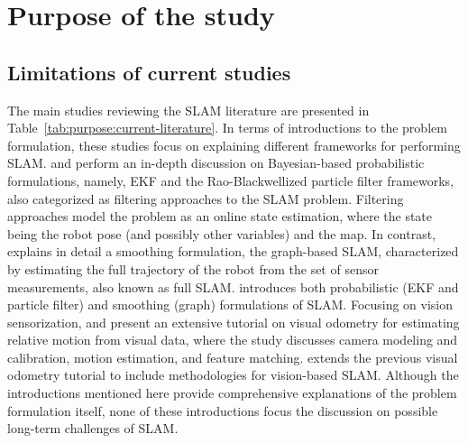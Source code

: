 \section{Purpose of the study}
\label{sec:purpose}

\subsection{Limitations of current studies}

The main studies reviewing the SLAM literature are presented in Table~\ref{tab:purpose:current-literature}. In terms of introductions to the problem formulation, these studies focus on explaining different frameworks for performing SLAM. \cite{purpose:study:durrant-whyte-bailey:2006:1} and \cite{purpose:study:durrant-whyte-bailey:2006:2} perform an in-depth discussion on Bayesian-based probabilistic formulations, namely, EKF and the Rao-Blackwellized particle filter frameworks, also categorized as filtering approaches to the SLAM problem. Filtering approaches model the problem as an online state estimation, where the state being the robot pose (and possibly other variables) and the map. In contrast, \cite{purpose:study:grisetti:2010} explains in detail a smoothing formulation, the graph-based SLAM, characterized by estimating the full trajectory of the robot from the set of sensor measurements, also known as full SLAM. \cite{purpose:study:thrun:2008} introduces both probabilistic (EKF and particle filter) and smoothing (graph) formulations of SLAM.
Focusing on vision sensorization, \cite{purpose:study:scaramuzza-fraundorfer:2011:1} and \cite{purpose:study:scaramuzza-fraundorfer:2012:2} present an extensive tutorial on visual odometry for estimating relative motion from visual data, where the study discusses camera modeling and calibration, motion estimation, and feature matching. \cite{purpose:study:yousif:2015} extends the previous visual odometry tutorial to include methodologies for vision-based SLAM.
Although the introductions mentioned here provide comprehensive explanations of the problem formulation itself, none of these introductions focus the discussion on possible long-term challenges of SLAM.

